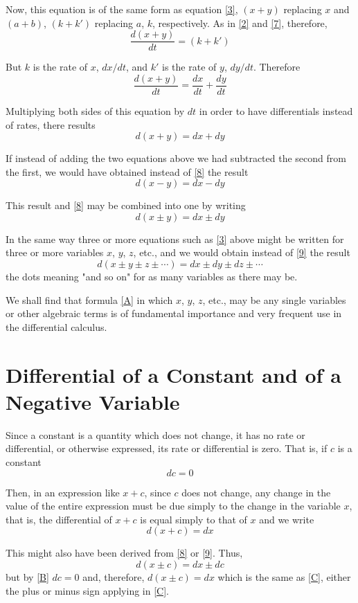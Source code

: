 Now, this equation is of the same form as equation \eqref{3}, $(x + y)$ replacing $x$ and $(a + b)$, $(k + k')$ replacing $a$, $k$, respectively. As in \eqref{2} and \eqref{7}, therefore,
\[\frac{d(x+y)}{dt} = (k + k')\]

But $k$ is the rate of $x$, $dx/dt$, and $k'$ is the rate of $y$, $dy/dt$. Therefore
\[\frac{d(x+y)}{dt} = \frac{dx}{dt} + \frac{dy}{dt}\]

Multiplying both sides of this equation by $dt$ in order to have differentials instead of rates, there results
\[d(x+y) = dx + dy \tag{8} \label{8}\]

If instead of adding the two equations above we had subtracted the second from the first, we would have obtained instead of \eqref{8} the result
\[d(x-y) = dx - dy\]

This result and \eqref{8} may be combined into one by writing
\[d(x \pm y) = dx \pm dy \tag{9} \label{9}\]

In the same way three or more equations such as \eqref{3} above might be written for three or more variables $x$, $y$, $z$, etc., and we would obtain instead of \eqref{9} the result
\[d(x \pm y \pm z \pm \cdots) = dx \pm dy \pm dz \pm \cdots \tag{A} \label{A}\]
the dots meaning "and so on" for as many variables as there may be.

We shall find that formula \eqref{A} in which $x$, $y$, $z$, etc., may be any single variables or other algebraic terms is of fundamental importance and very frequent use in the differential calculus.

\section{Differential of a Constant and of a Negative Variable}
Since a constant is a quantity which does not change, it has no rate or differential, or otherwise expressed, its rate or differential is zero. That is, if $c$ is a constant
\[dc = 0 \tag{B} \label{B}\]

Then, in an expression like $x + c$, since $c$ does not change, any change in the value of the entire expression must be due simply to the change in the variable $x$, that is, the differential of $x + c$ is equal simply to that of $x$ and we write
\[d(x + c) = dx \tag{C} \label{C}\]

This might also have been derived from \eqref{8} or \eqref{9}. Thus,
\[d(x \pm c) = dx \pm dc\]
but by \eqref{B} $dc = 0$ and, therefore, $d(x \pm c) = dx$
which is the same as \eqref{C}, either the plus or minus sign applying in \eqref{C}.

